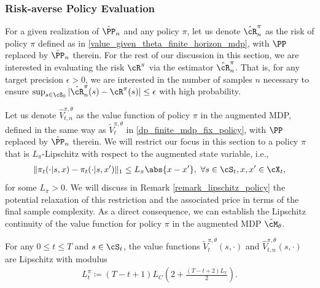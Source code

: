 \documentclass[9pt]{article}
\numberwithin{equation}{section}
\begin{document}
\subsubsection{Risk-averse Policy Evaluation}\label{subsec_policy_eval_mdp}
For a given realization of $\hat{\PP}_n$ and any policy $\pi$, let us denote 
$\hat{\cR}^\pi_n$ as the risk  of policy $\pi$ defined as in \eqref{value_given_theta_finite_horizon_mdp}, with $\PP$ replaced by  $\hat{\PP}_n$ therein. 
For the rest of our discussion in this section, we are interested in evaluating the risk $\cR^\pi$  via the estimator $\hat{\cR}^\pi_n$.
That is, for  any target precision $\epsilon > 0$, we are interested in the number of samples $n$ necessary to ensure 
$\sup_{s \in \cS_0} |{ \hat{\cR}^\pi_n(s) - \cR^\pi(s)}| \leq \epsilon$ with high probability. 

Let us denote $\hat{V}_{t,n}^{\pi,\theta}$ as the value function of policy $\pi$ in the augmented MDP, defined in the same way as $\tilde{V}^{\pi, \theta}_t$ in \eqref{dp_finite_mdp_fix_policy}, with $\PP$ replaced by $\hat{\PP}_n$ therein.
We will restrict our focus in this section to a policy $\pi$ that is $L_\pi$-Lipschitz with respect to the augmented state variable, i.e., 
\begin{align}\label{eq_finite_mdp_policy_lip}
    \|\pi_t(\cdot|s,x) - \pi_t(\cdot|s,x')\|_1 \leq L_\pi\abs{x-x'}, ~ \forall s \in \cS_t, x,x' \in \cX_t,
\end{align}
for some $L_\pi > 0$.
We will discuss in Remark \ref{remark_lipschitz_policy} the potential relaxation of this restriction and the associated price in terms of the final sample complexity. 
As a direct consequence, we can establish the Lipschitz continuity of the value function for policy $\pi$ in the augmented MDP $\tilde{\cM}_\theta$.

\begin{lemma}\label{lemma_fin_mdp_pol_eval_val_lip}
    For any $0 \leq t \leq T$ and $s \in \cS_t$, the value functions $\tilde{V}_t^{\pi, \theta}(s, \cdot)$
    and $\hat{V}_{t,n}^{\pi, \theta}(s, \cdot)$ are Lipschitz with modulus   
    \begin{align*}
        L^\pi_{t} \coloneqq (T-t+1)L_C\left(2 + \tfrac{(T-t+2)L_\pi}{2}\right).
    \end{align*}
\end{lemma}
\end{document}
